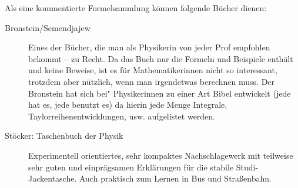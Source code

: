 Als eine kommentierte Formelsammlung können folgende Bücher dienen:

\begin{description}
\item[Bronstein/Semendjajew]{
		Eines der Bücher, die man als Physikerin von jeder Prof empfohlen bekommt -- zu Recht. Da das Buch nur die Formeln und Beispiele enthält und keine Beweise, ist es für Mathematikerinnen nicht so interessant, trotzdem aber nützlich, wenn man irgendetwas berechnen muss. Der Bronstein hat sich bei" Physikerinnen zu einer Art Bibel entwickelt (jede hat es, jede benutzt es) da hierin jede Menge Integrale, Taylorreihenentwicklungen, usw. aufgelistet werden.}

\item[Stöcker: Taschenbuch der Physik]{
		Experimentell orientiertes, sehr kompaktes Nachschlagewerk mit teilweise sehr guten und einprägsamen Erklärungen für die stabile Studi- Jackentasche. Auch praktisch zum Lernen in Bus und Straßenbahn.}
\end{description}